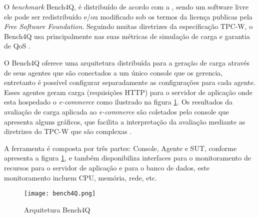 O \textit{benchmark} Bench4Q, é distribuído de acordo com a , sendo um software livre ele pode ser redistribuído e/ou modificado sob os termos da licença publicas pela \textit{Free Software Foundation}. Seguindo muitas diretrizes da especificação TPC-W, o Bench4Q usa principalmente nas suas métricas de simulação de carga e garantia de QoS \cite{Bench4Q}. 

O Bench4Q oferece uma arquitetura distribuída para a geração de carga através de seus agentes que são conectados a um único console que os gerencia, entretanto é possível configurar separadamente as configurações para cada agente. Esses agentes geram carga (requisições HTTP) para o servidor de aplicação onde esta hospedado o \textit{e-commerce} como ilustrado na figura \ref{fig:arquitetura-bench4q}. Os resultados da avaliação de carga aplicada ao \textit{e-commerce} são coletados pelo console que apresenta alguns gráficos, que facilita a interpretação da avaliação mediante as diretrizes do TPC-W que são complexas \cite{Bench4Q}.

A ferramenta é composta por três partes: Console, Agente e SUT, conforme apresenta a figura \ref{fig:arquitetura-bench4q}, e também disponibiliza interfaces para o monitoramento de recursos para o servidor de aplicação e para o banco de dados, este monitoramento incluem CPU, memória, rede, etc.


\begin{figure}[htb]
	\caption{Arquitetura Bench4Q}
	\label{fig:arquitetura-bench4q}
	\centering
	\texttt{[image: bench4Q.png]}
\end{figure}

